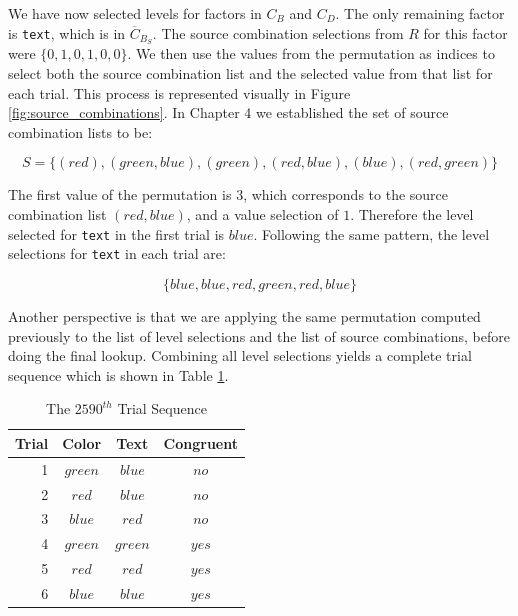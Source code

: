 We have now selected levels for factors in $C_B$ and $C_D$. The only remaining factor is \texttt{text}, which is in $\overline{C}_{B_S}$. The source combination selections from $R$ for this factor were $\{0, 1, 0, 1, 0, 0\}$. We then use the values from the permutation as indices to select both the source combination list and the selected value from that list for each trial. This process is represented visually in Figure \ref{fig:source_combinations}. In Chapter 4 we established the set of source combination lists to be:

\[
S = \{(red), (green, blue), (green), (red, blue), (blue), (red, green)\}
\]

The first value of the permutation is $3$, which corresponds to the source combination list $(red, blue)$, and a value selection of $1$. Therefore the level selected for \texttt{text} in the first trial is $blue$. Following the same pattern, the level selections for \texttt{text} in each trial are:

\[
  \{blue, blue, red, green, red, blue\}
\]

Another perspective is that we are applying the same permutation computed previously to the list of level selections and the list of source combinations, before doing the final lookup. Combining all level selections yields a complete trial sequence which is shown in Table \ref{tab:example_trial_sequence}.

\begin{table}[b]
  \centering
  \caption{The $2590^{th}$ Trial Sequence}
\begin{tabular}{rccc}
\multicolumn{1}{c}{Trial} & Color   & Text    & Congruent \\ \hline
1                         & $green$ & $blue$  & $no$      \\
2                         & $red$   & $blue$  & $no$      \\
3                         & $blue$  & $red$   & $no$      \\
4                         & $green$ & $green$ & $yes$     \\
5                         & $red$   & $red$   & $yes$     \\
6                         & $blue$  & $blue$  & $yes$
\end{tabular}
\label{tab:example_trial_sequence}
\end{table}


